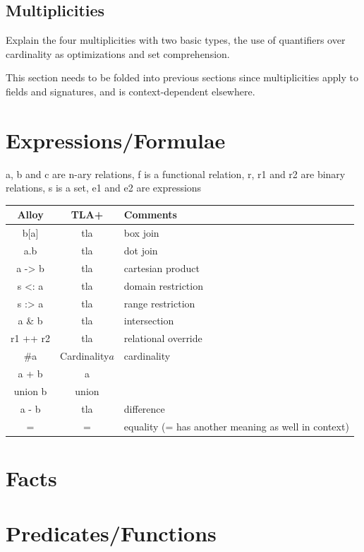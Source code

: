 \subsection{Multiplicities}

Explain the four multiplicities with two basic types, the use of quantifiers over cardinality as optimizations and set comprehension.

This section needs to be folded into previous sections since multiplicities apply to fields and signatures, and is context-dependent elsewhere.

\section{Expressions/Formulae}

a, b and c are n-ary relations, f is a functional relation, r, r1 and r2 are binary relations, s is a set, e1 and e2 are expressions

\begin{tabular}{ c | c | l }
	\hline			
	Alloy & TLA+ & Comments \\
	\hline
	b[a] & tla & box join \\
	a.b & tla & dot join \\
	a -> b & tla & cartesian product \\
	s <: a & tla & domain restriction \\
	s :> a & tla & range restriction \\
	a \& b & tla & intersection \\
	r1 ++ r2 & tla & relational override \\
	\#a & Cardinality\(a\) & cardinality \\
	a + b & a \\union b & union \\
	a - b & tla & difference \\
	= & = & equality (= has another meaning as well in context) \\


	\hline  
\end{tabular}

\section{Facts}

\section{Predicates/Functions}




